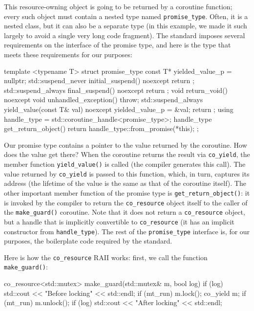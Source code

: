 This resource-owning object is going to be returned by a coroutine function; every such object must contain a nested type named \texttt{promise\_type}. Often, it is a nested class, but it can also be a separate type (in this example, we made it such largely to avoid a single very long code fragment). The standard imposes several requirements on the interface of the promise type, and here is the type that meets these requirements for our purposes:

\begin{code}
template <typename T> struct promise_type {
  const T* yielded_value_p = nullptr;
  std::suspend_never initial_suspend() noexcept {
    return {};
  }
  std::suspend_always final_suspend() noexcept {
    return {};
  }
  void return_void() noexcept {}
  void unhandled_exception() { throw; }
  std::suspend_always yield_value(const T& val) noexcept {
    yielded_value_p = &val;
    return {};
  }
  using handle_type = std::coroutine_handle<promise_type>;
  handle_type get_return_object() {
    return handle_type::from_promise(*this);
  }
};
\end{code}

Our promise type contains a pointer to the value returned by the coroutine. How does the value get there? When the coroutine returns the result via \texttt{co\_yield}, the member function \texttt{yield\_value()} is called (the compiler generates this call). The value returned by \texttt{co\_yield} is passed to this function, which, in turn, captures its address (the lifetime of the value is the same as that of the coroutine itself). The other important member function of the promise type is \texttt{get\_return\_object()}: it is invoked by the compiler to return the \texttt{co\_resource} object itself to the caller of the \texttt{make\_guard()} coroutine. Note that it does not return a \texttt{co\_resource} object, but a handle that is implicitly convertible to \texttt{co\_resource} (it has an implicit constructor from \texttt{handle\_type}). The rest of the \texttt{promise\_type} interface is, for our purposes, the boilerplate code required by the standard.

Here is how the \texttt{co\_resource} RAII works: first, we call the function \texttt{make\_guard()}:

\begin{code}
co_resource<std::mutex> make_guard(std::mutex& m, bool log)
{
  if (log) std::cout << "Before locking" << std::endl;
  if (mt_run) m.lock();
  co_yield m;
  if (mt_run) m.unlock();
  if (log) std::cout << "After locking" << std::endl;
}
\end{code}

